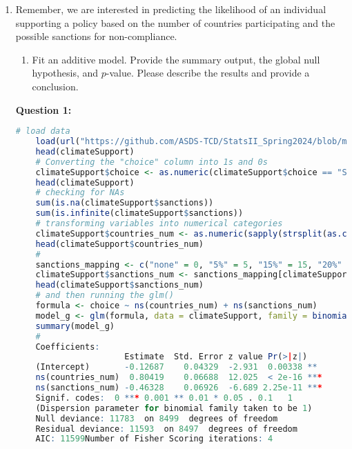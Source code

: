 \documentclass[12pt,letterpaper]{article}
\begin{document}
\begin{enumerate}
	\item
	Remember, we are interested in predicting the likelihood of an individual supporting a policy based on the number of countries participating and the possible sanctions for non-compliance.
	\begin{enumerate}
		\item [] Fit an additive model. Provide the summary output, the global null hypothesis, and $p$-value. Please describe the results and provide a conclusion.
	\end{enumerate}
\textbf{Question 1:}
\begin{lstlisting}[language=R]
	# load data
	load(url("https://github.com/ASDS-TCD/StatsII_Spring2024/blob/main/datasets/climateSupport.RData?raw=true"))
	head(climateSupport)
	# Converting the "choice" column into 1s and 0s
	climateSupport$choice <- as.numeric(climateSupport$choice == "Supported")
	head(climateSupport)
	# checking for NAs
	sum(is.na(climateSupport$sanctions))
	sum(is.infinite(climateSupport$sanctions))
	# transforming variables into numerical categories
	climateSupport$countries_num <- as.numeric(sapply(strsplit(as.character(climateSupport$countries), "of"), "[", 1))
	head(climateSupport$countries_num)
	#
	sanctions_mapping <- c("none" = 0, "5%" = 5, "15%" = 15, "20%" = 20)
	climateSupport$sanctions_num <- sanctions_mapping[climateSupport$sanctions]
	head(climateSupport$sanctions_num)
	# and then running the glm()
	formula <- choice ~ ns(countries_num) + ns(sanctions_num)
	model_g <- glm(formula, data = climateSupport, family = binomial(link = "logit"))
	summary(model_g)
	#
	Coefficients:                  
	                  Estimate  Std. Error z value Pr(>|z|)    
	(Intercept)       -0.12687    0.04329  -2.931  0.00338 ** 
	ns(countries_num)  0.80419    0.06688  12.025  < 2e-16 ***
	ns(sanctions_num) -0.46328    0.06926  -6.689 2.25e-11 ***
	Signif. codes:  0 *** 0.001 ** 0.01 * 0.05 . 0.1   1
	(Dispersion parameter for binomial family taken to be 1)    
	Null deviance: 11783  on 8499  degrees of freedom
	Residual deviance: 11593  on 8497  degrees of freedom
	AIC: 11599Number of Fisher Scoring iterations: 4
\end{lstlisting}	

\end{enumerate}
\end{document}
